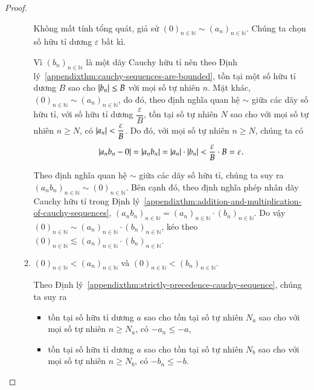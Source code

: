 \begin{proof}
\begin{enumerate}[label={(\roman*)}]
\begin{enumerate}[label={\textbf{Trường hợp \arabic*.}},itemindent=1cm]
                        Không mất tính tổng quát, giả sử ${(0)}_{n\in\mathbb{N}}\sim {(a_{n})}_{n\in\mathbb{N}}$. Chúng ta chọn số hữu tỉ dương $\varepsilon$ bất kì.

                        Vì ${(b_{n})}_{n\in\mathbb{N}}$ là một dãy Cauchy hữu tỉ nên theo Định lý~\ref{appendixthm:cauchy-sequences-are-bounded}, tồn tại một số hữu tỉ dương $B$ sao cho $\left\vert{b_{n}}\right\vert\leq B$ với mọi số tự nhiên $n$. Mặt khác, ${(0)}_{n\in\mathbb{N}}\sim {(a_{n})}_{n\in\mathbb{N}}$, do đó, theo định nghĩa quan hệ $\sim$ giữa các dãy số hữu tỉ, với số hữu tỉ dương $\dfrac{\varepsilon}{B}$, tồn tại số tự nhiên $N$ sao cho với mọi số tự nhiên $n\geq N$, có $\left\vert{a_{n}}\right\vert < \dfrac{\varepsilon}{B}$. Do đó, với mọi số tự nhiên $n\geq N$, chúng ta có
                        \[
                            \left\vert{a_{n}b_{n} - 0}\right\vert = \left\vert{a_{n}b_{n}}\right\vert = \left\vert{a_{n}}\right\vert\cdot\left\vert{b_{n}}\right\vert < \dfrac{\varepsilon}{B}\cdot B = \varepsilon.
                        \]

                        Theo định nghĩa quan hệ $\sim$ giữa các dãy số hữu tỉ, chúng ta suy ra ${(a_{n}b_{n})}_{n\in\mathbb{N}}\sim {(0)}_{n\in\mathbb{N}}$. Bên cạnh đó, theo định nghĩa phép nhân dãy Cauchy hữu tỉ trong Định lý~\ref{appendixthm:addition-and-multiplication-of-cauchy-sequences}, ${(a_{n}b_{n})}_{n\in\mathbb{N}} = {(a_{n})}_{n\in\mathbb{N}}\cdot {(b_{n})}_{n\in\mathbb{N}}$. Do vậy ${(0)}_{n\in\mathbb{N}}\sim {(a_{n})}_{n\in\mathbb{N}}\cdot {(b_{n})}_{n\in\mathbb{N}}$, kéo theo ${(0)}_{n\in\mathbb{N}}\lesssim {(a_{n})}_{n\in\mathbb{N}}\cdot {(b_{n})}_{n\in\mathbb{N}}$.
                  \item ${(0)}_{n\in\mathbb{N}} < {(a_{n})}_{n\in\mathbb{N}}$ và ${(0)}_{n\in\mathbb{N}} < {(b_{n})}_{n\in\mathbb{N}}$.

                        Theo Định lý~\ref{appendixthm:strictly-precedence-cauchy-sequence}, chúng ta suy ra
                        \begin{itemize}
                            \item tồn tại số hữu tỉ dương $a$ sao cho tồn tại số tự nhiên $N_{a}$ sao cho với mọi số tự nhiên $n\geq N_{a}$, có $-a_{n}\leq -a$,
                            \item tồn tại số hữu tỉ dương $a$ sao cho tồn tại số tự nhiên $N_{b}$ sao cho với mọi số tự nhiên $n\geq N_{b}$, có $-b_{n}\leq -b$.
                        \end{itemize}


\end{enumerate}
\end{enumerate}
\end{proof}
